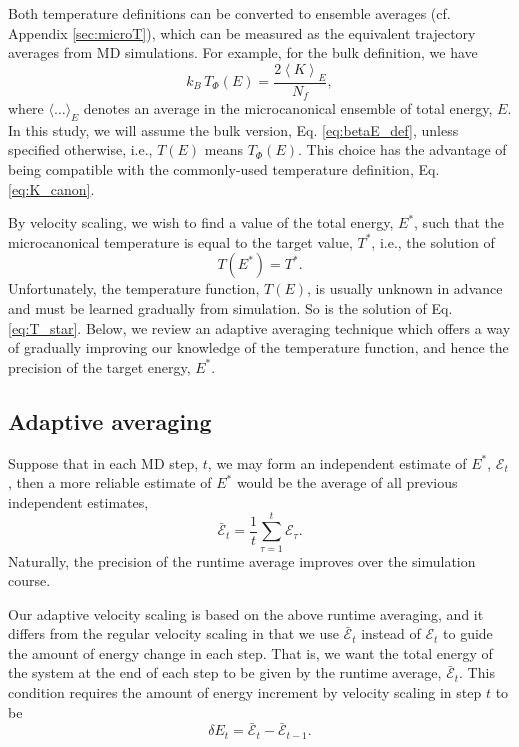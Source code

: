 \documentclass[reprint]{revtex4-1}
\begin{document}
Both temperature definitions can be converted to
ensemble averages (cf. Appendix \ref{sec:microT}),
which can be measured as the equivalent
trajectory averages from MD simulations.
%
For example, for the bulk definition, we have
%
\begin{equation}
  k_B \, T_\Phi(E)
  =
  \frac{ 2 \left\langle K \right\rangle_E } { N_f }
  ,
  \label{eq:TE_K}
\end{equation}
%
where $\langle \dots \rangle_E$ denotes
an average in the microcanonical ensemble of total energy, $E$.
%
In this study,
we will assume the bulk version, Eq. \eqref{eq:betaE_def},
unless specified otherwise,
i.e., $T(E)$ means $T_\Phi(E)$.
%
This choice has the advantage of being compatible
with the commonly-used temperature definition, Eq. \eqref{eq:K_canon}.
%


By velocity scaling, we wish to
find a value of the total energy, $E^*$,
such that the microcanonical temperature
is equal to the target value, $T^*$,
i.e., the solution of
%
\begin{equation}
  T(E^*)
  =
  T^*
  .
  \label{eq:T_star}
\end{equation}
%
Unfortunately, the temperature function, $T(E)$,
is usually unknown in advance
and must be learned gradually from simulation.
%
So is the solution of Eq. \eqref{eq:T_star}.
%
Below, we review an adaptive averaging technique
which offers a way of gradually improving
our knowledge of the temperature function,
and hence the precision of the target energy, $E^*$.



\subsection{Adaptive averaging}



Suppose that in each MD step, $t$,
we may form an independent estimate of $E^*$,
$\mathcal E_t$,
then a more reliable estimate of $E^*$
would be the average of
all previous independent estimates,
%
\begin{equation}
  \bar{\mathcal E}_t
  =
  \frac 1 t
  \sum_{\tau = 1}^t
    \mathcal E_\tau
  .
  \label{eq:Epsave}
\end{equation}
%
Naturally, the precision of the runtime average
improves over the simulation course.



Our adaptive velocity scaling is based on
the above runtime averaging,
and it differs from the regular velocity scaling
in that we use $\bar{\mathcal E}_t$
instead of $\mathcal E_t$
to guide the amount of energy change in each step.
%
That is, we want
the total energy of the system
at the end of each step
to be given by
the runtime average, $\bar{\mathcal E}_t$.
%
This condition requires the amount of energy increment
by velocity scaling in step $t$ to be
%
\begin{equation}
  \delta E_t
  =
  \bar{\mathcal E}_t - \bar{\mathcal E}_{t - 1}
  .
  \label{eq:dE_adaptive}
\end{equation}
\end{document}
